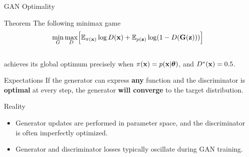 \documentclass{beamer}
\begin{document}
\begin{frame}{GAN Optimality}
	\begin{block}{Theorem}
		The following minimax game 
		\vspace{-0.3cm}
		\[
		\min_{G} \max_D \Bigl[ \mathbb{E}_{\pi(\mathbf{x})} \log D(\mathbf{x}) + \mathbb{E}_{p(\mathbf{z})} \log (1 - D(\mathbf{G}(\mathbf{z}))) \Bigr]
		\]
		\vspace{-0.5cm} \\
		achieves its global optimum precisely when $\pi(\mathbf{x}) = p(\mathbf{x} | \boldsymbol{\theta})$, and $D^*(\mathbf{x}) = 0.5$.
	\end{block}
	\vspace{-0.2cm}
	\begin{block}{Expectations}
		If the generator can express \textbf{any} function and the discriminator is \textbf{optimal} at every step, the generator \textbf{will converge} to the target distribution.
	\end{block}
	\eqpause
	\begin{block}{Reality}
		\begin{itemize}
			\item Generator updates are performed in parameter space, and the discriminator is often imperfectly optimized.
			\item Generator and discriminator losses typically oscillate during GAN training.
		\end{itemize}
	\end{block}
\end{frame}
\end{document}
